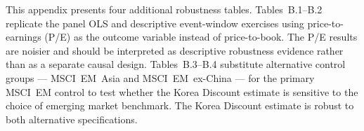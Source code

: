 \documentclass[12pt]{article}
\begin{document}
\begin{appendices}
This appendix presents four additional robustness tables. Tables~B.1--B.2 replicate the
panel OLS and descriptive event-window exercises using price-to-earnings (P/E) as the outcome
variable instead of price-to-book. The P/E results are noisier and should be interpreted as
descriptive robustness evidence rather than as a separate causal design. Tables~B.3--B.4 substitute
alternative control groups --- MSCI~EM~Asia and MSCI~EM~ex-China --- for the primary MSCI~EM
control to test whether the Korea Discount estimate is sensitive to the choice of emerging
market benchmark. The Korea Discount estimate is robust to both alternative specifications.






\end{appendices}
\end{document}
